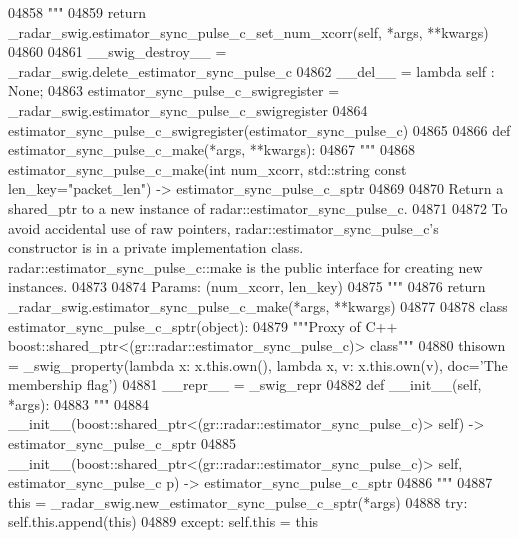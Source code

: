 \begin{DoxyCode}
{{{{{{{{{{{{{{{{{04858 \textcolor{stringliteral}{        """}
04859         \textcolor{keywordflow}{return} \_radar\_swig.estimator\_sync\_pulse\_c\_set\_num\_xcorr(self, *args, **kwargs)
04860 
04861     \_\_swig\_destroy\_\_ = \_radar\_swig.delete\_estimator\_sync\_pulse\_c
04862     \_\_del\_\_ = \textcolor{keyword}{lambda} self : \textcolor{keywordtype}{None};
04863 estimator\_sync\_pulse\_c\_swigregister = \_radar\_swig.estimator\_sync\_pulse\_c\_swigregister
04864 estimator_sync_pulse_c_swigregister(estimator\_sync\_pulse\_c)
04865 
04866 \textcolor{keyword}{def }estimator_sync_pulse_c_make(*args, **kwargs):
04867   \textcolor{stringliteral}{"""}
04868 \textcolor{stringliteral}{    estimator\_sync\_pulse\_c\_make(int num\_xcorr, std::string const len\_key="packet\_len") ->
       estimator\_sync\_pulse\_c\_sptr}
04869 \textcolor{stringliteral}{}
04870 \textcolor{stringliteral}{    Return a shared\_ptr to a new instance of radar::estimator\_sync\_pulse\_c.}
04871 \textcolor{stringliteral}{}
04872 \textcolor{stringliteral}{    To avoid accidental use of raw pointers, radar::estimator\_sync\_pulse\_c's constructor is in a private
       implementation class. radar::estimator\_sync\_pulse\_c::make is the public interface for creating new instances.}
04873 \textcolor{stringliteral}{}
04874 \textcolor{stringliteral}{    Params: (num\_xcorr, len\_key)}
04875 \textcolor{stringliteral}{    """}
04876   \textcolor{keywordflow}{return} \_radar\_swig.estimator\_sync\_pulse\_c\_make(*args, **kwargs)
04877 
04878 \textcolor{keyword}{class }estimator_sync_pulse_c_sptr(object):
04879     \textcolor{stringliteral}{"""Proxy of C++ boost::shared\_ptr<(gr::radar::estimator\_sync\_pulse\_c)> class"""}
04880     thisown = _swig_property(\textcolor{keyword}{lambda} x: x.this.own(), \textcolor{keyword}{lambda} x, v: x.this.own(v), doc=\textcolor{stringliteral}{'The membership flag'})
04881     \_\_repr\_\_ = \_swig\_repr
04882     \textcolor{keyword}{def }__init__(self, *args): 
04883         \textcolor{stringliteral}{"""}
04884 \textcolor{stringliteral}{        \_\_init\_\_(boost::shared\_ptr<(gr::radar::estimator\_sync\_pulse\_c)> self) ->
       estimator\_sync\_pulse\_c\_sptr}
04885 \textcolor{stringliteral}{        \_\_init\_\_(boost::shared\_ptr<(gr::radar::estimator\_sync\_pulse\_c)> self, estimator\_sync\_pulse\_c p) ->
       estimator\_sync\_pulse\_c\_sptr}
04886 \textcolor{stringliteral}{        """}
04887         this = \_radar\_swig.new\_estimator\_sync\_pulse\_c\_sptr(*args)
04888         \textcolor{keywordflow}{try}: self.this.append(this)
04889         \textcolor{keywordflow}{except}: self.this = this
}}}}}}}}}}}}}}}}}
\end{DoxyCode}
